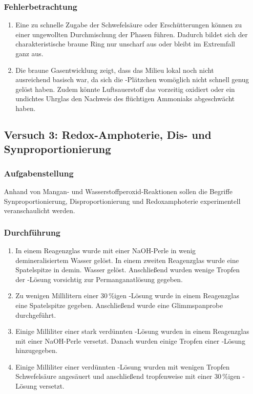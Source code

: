 \subsubsection{Fehlerbetrachtung}
\begin{enumerate}[label=\textbf{\alph*)}]
    \item Eine zu schnelle Zugabe der Schwefelsäure oder Erschütterungen können zu einer ungewollten Durchmischung der Phasen führen. Dadurch bildet sich der charakteristische braune Ring nur unscharf aus oder bleibt im Extremfall ganz aus.
    \item Die braune Gasentwicklung zeigt, dass das Milieu lokal noch nicht ausreichend basisch war, da sich die -Plätzchen womöglich nicht schnell genug gelöst haben. Zudem könnte Luftsauerstoff das  vorzeitig oxidiert oder ein undichtes Uhrglas den Nachweis des flüchtigen Ammoniaks abgeschwächt haben.
\end{enumerate}


\subsection{Versuch 3: Redox-Amphoterie, Dis- und Synproportionierung}

\subsubsection{Aufgabenstellung}
Anhand von Mangan- und Wasserstoffperoxid-Reaktionen sollen die Begriffe Synproportionierung, Disproportionierung und Redoxamphoterie experimentell veranschaulicht werden.

\subsubsection{Durchführung}
\begin{enumerate}[label=\textbf{\alph*)}]
    \item In einem Reagenzglas wurde  mit einer NaOH-Perle in wenig demineralisiertem Wasser gelöst. In einem zweiten Reagenzglas wurde eine Spatelspitze  in demin. Wasser gelöst. Anschließend wurden wenige Tropfen der -Lösung vorsichtig zur Permanganatlösung gegeben.
    \item Zu wenigen Millilitern einer 30\,\%igen -Lösung wurde in einem Reagenzglas eine Spatelspitze  gegeben. Anschließend wurde eine Glimmspanprobe durchgeführt.
    \item Einige Milliliter einer stark verdünnten -Lösung wurden in einem Reagenzglas mit einer NaOH-Perle versetzt. Danach wurden einige Tropfen einer -Lösung hinzugegeben.
    \item Einige Milliliter einer verdünnten -Lösung wurden mit wenigen Tropfen Schwefelsäure angesäuert und anschließend tropfenweise mit einer 30\,\%igen -Lösung versetzt.
\end{enumerate}

